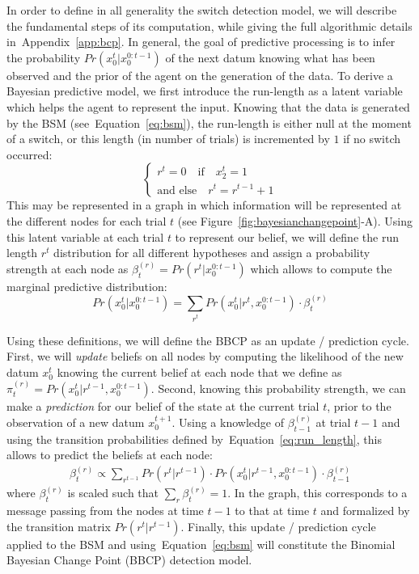 \documentclass[12pt,english]{article}%
\newcommand{\choice}[1]{ %
	\left\{ %
		\begin{array}{l} #1 \end{array} %
	\right. }
\newcommand{\eql}[1]{\begin{equation}#1\end{equation}}
\newcommand{\eqa}[1]{\begin{align}#1\end{align}}
\newcommand{\seeFig}[1]{Figure~\ref{fig:#1}}
\newcommand{\seeEq}[1]{Equation~\ref{eq:#1}}
\newcommand{\seeApp}[1]{Appendix~\ref{app:#1}}
\begin{document}
In order to define in all generality the switch detection model,
we will describe the fundamental steps of its computation,
while giving the full algorithmic details in~\seeApp{bcp}.
In general, the goal of predictive processing
is to infer the probability $Pr(x_0^t | x_0^{0:t-1})$ of the next datum
knowing what has been observed and
the prior of the agent on the generation of the data.
To derive a Bayesian predictive model, we first introduce
the run-length as a latent variable which helps the agent to represent the input.
Knowing that the data is generated by the BSM (see~\seeEq{bsm}),
the run-length is either null at the moment of a switch,
or this length (in number of trials) is incremented by $1$ if no switch occurred:
\eql{\choice{
r^t = 0 \quad \text{if} \quad x_2^t=1 \\
\text{and else} \quad r^t = r^{t-1} +1 }\label{eq:run_length}}%
This may be represented in a graph
in which information will be represented at the different nodes for each trial $t$ (see \seeFig{bayesianchangepoint}-A).
Using this latent variable at each trial $t$ to represent our belief,
we will define the run length $r^t$ distribution
for all different hypotheses
and assign a probability strength at each node
as $\beta^{(r)}_t=Pr(r^t | x_0^{0:t-1})$
which allows to compute the marginal predictive distribution:
\eql{
Pr(x_0^t | x_0^{0:t-1}) = \sum_{r^{t}} Pr(x_0^t | r^{t}, x_0^{0:t-1}) \cdot  \beta^{(r)}_t
\label{eq:pred}
}

Using these definitions, we will define the BBCP
as an update / prediction cycle.
First, we will \emph{update} beliefs on all nodes
by computing the likelihood of the new datum $x_0^t$ 
knowing the current belief at each node
that we define as $\pi^{(r)}_t=Pr(x_0^t | r^{t-1}, x_0^{0:t-1})$.
Second, knowing this probability strength, %
we can make a \emph{prediction} for our belief of the state at the current trial $t$,
prior to the observation of a new datum $x_0^{t+1}$.
Using a knowledge of $\beta^{(r)}_{t-1}$ at trial $t-1$ and
using the transition probabilities defined by~\seeEq{run_length},
this allows to predict the beliefs at each node:
\eqa{
\beta^{(r)}_t \propto \sum_{r^{t-1}}  Pr(r^t | r^{t-1}) \cdot  Pr(x_0^t | r^{t-1}, x_0^{0:t-1}) \cdot  \beta^{(r)}_{t-1}
\label{eq:pred_node}
}
where $\beta^{(r)}_t$ is scaled such that $\sum_r \beta^{(r)}_t = 1$.
In the graph, this corresponds to a message passing from the nodes at time $t-1$
to that at time $t$ and formalized by the transition matrix $Pr(r^t | r^{t-1})$.
Finally, this update / prediction cycle applied to the BSM and using~\seeEq{bsm}
will constitute the Binomial Bayesian Change Point (BBCP) detection model.
\end{document}
